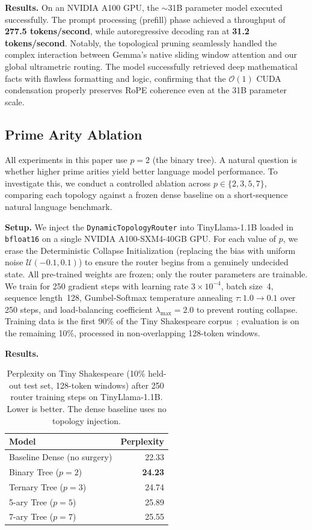 \documentclass[11pt,a4paper]{article}
\begin{document}
\textbf{Results.} On an NVIDIA A100 GPU, the $\sim$31B parameter model executed successfully. The prompt processing (prefill) phase achieved a throughput of \textbf{277.5 tokens/second}, while autoregressive decoding ran at \textbf{31.2 tokens/second}. Notably, the topological pruning seamlessly handled the complex interaction between Gemma's native sliding window attention and our global ultrametric routing. The model successfully retrieved deep mathematical facts with flawless formatting and logic, confirming that the $\mathcal{O}(1)$ CUDA condensation properly preserves RoPE coherence even at the 31B parameter scale.

\subsection{Prime Arity Ablation}
\label{sec:prime_arity}

All experiments in this paper use $p = 2$ (the binary tree). A natural question is whether higher prime arities yield better language model performance. To investigate this, we conduct a controlled ablation across $p \in \{2, 3, 5, 7\}$, comparing each topology against a frozen dense baseline on a short-sequence natural language benchmark.

\textbf{Setup.} We inject the \texttt{DynamicTopologyRouter} into TinyLlama-1.1B loaded in \texttt{bfloat16} on a single NVIDIA A100-SXM4-40GB GPU. For each value of $p$, we erase the Deterministic Collapse Initialization (replacing the bias with uniform noise $\mathcal{U}(-0.1, 0.1)$) to ensure the router begins from a genuinely undecided state. All pre-trained weights are frozen; only the router parameters are trainable. We train for 250 gradient steps with learning rate $3 \times 10^{-4}$, batch size~4, sequence length~128, Gumbel-Softmax temperature annealing $\tau: 1.0 \to 0.1$ over 250 steps, and load-balancing coefficient $\lambda_{\max} = 2.0$ to prevent routing collapse. Training data is the first 90\% of the Tiny Shakespeare corpus~\citep{karpathy2015char}; evaluation is on the remaining 10\%, processed in non-overlapping 128-token windows.

\textbf{Results.}

\begin{table}[h]
\centering
\caption{Perplexity on Tiny Shakespeare (10\% held-out test set, 128-token windows) after 250 router training steps on TinyLlama-1.1B. Lower is better. The dense baseline uses no topology injection.}
\label{tab:prime_arity}
\begin{tabular}{@{}lr@{}}
\toprule
Model & Perplexity \\
\midrule
Baseline Dense (no surgery) & 22.33 \\
Binary Tree ($p=2$)         & \textbf{24.23} \\
Ternary Tree ($p=3$)        & 24.74 \\
5-ary Tree ($p=5$)          & 25.89 \\
7-ary Tree ($p=7$)          & 25.55 \\
\bottomrule
\end{tabular}
\end{table}
\end{document}
